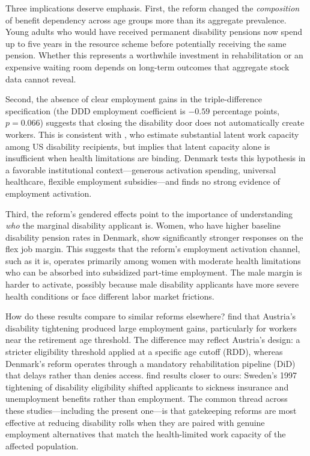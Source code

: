 \documentclass[12pt]{article}
\begin{document}
Three implications deserve emphasis. First, the reform changed the \textit{composition} of benefit dependency across age groups more than its aggregate prevalence. Young adults who would have received permanent disability pensions now spend up to five years in the resource scheme before potentially receiving the same pension. Whether this represents a worthwhile investment in rehabilitation or an expensive waiting room depends on long-term outcomes that aggregate stock data cannot reveal.

Second, the absence of clear employment gains in the triple-difference specification (the DDD employment coefficient is $-0.59$ percentage points, $p = 0.066$) suggests that closing the disability door does not automatically create workers. This is consistent with \citet{maestas2013does}, who estimate substantial latent work capacity among US disability recipients, but implies that latent capacity alone is insufficient when health limitations are binding. Denmark tests this hypothesis in a favorable institutional context---generous activation spending, universal healthcare, flexible employment subsidies---and finds no strong evidence of employment activation.

Third, the reform's gendered effects point to the importance of understanding \textit{who} the marginal disability applicant is. Women, who have higher baseline disability pension rates in Denmark, show significantly stronger responses on the flex job margin. This suggests that the reform's employment activation channel, such as it is, operates primarily among women with moderate health limitations who can be absorbed into subsidized part-time employment. The male margin is harder to activate, possibly because male disability applicants have more severe health conditions or face different labor market frictions.

How do these results compare to similar reforms elsewhere? \citet{haller2024disability} find that Austria's disability tightening produced large employment gains, particularly for workers near the retirement age threshold. The difference may reflect Austria's design: a stricter eligibility threshold applied at a specific age cutoff (RDD), whereas Denmark's reform operates through a mandatory rehabilitation pipeline (DiD) that delays rather than denies access. \citet{karlstrom2008disability} find results closer to ours: Sweden's 1997 tightening of disability eligibility shifted applicants to sickness insurance and unemployment benefits rather than employment. The common thread across these studies---including the present one---is that gatekeeping reforms are most effective at reducing disability rolls when they are paired with genuine employment alternatives that match the health-limited work capacity of the affected population.
\end{document}
